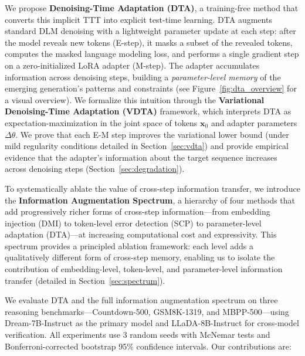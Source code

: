 \documentclass{article}
\begin{document}
We propose \textbf{Denoising-Time Adaptation (DTA)}, a training-free method that converts this implicit TTT into explicit test-time learning. DTA augments standard DLM denoising with a lightweight parameter update at each step: after the model reveals new tokens (E-step), it masks a subset of the revealed tokens, computes the masked language modeling loss, and performs a single gradient step on a zero-initialized LoRA adapter (M-step). The adapter accumulates information across denoising steps, building a \emph{parameter-level memory} of the emerging generation's patterns and constraints (see Figure~\ref{fig:dta_overview} for a visual overview). We formalize this intuition through the \textbf{Variational Denoising-Time Adaptation (VDTA)} framework, which interprets DTA as expectation-maximization in the joint space of tokens $\mathbf{x}_0$ and adapter parameters $\Delta\theta$. We prove that each E-M step improves the variational lower bound (under mild regularity conditions detailed in Section~\ref{sec:vdta}) and provide empirical evidence that the adapter's information about the target sequence increases across denoising steps (Section~\ref{sec:degradation}).

To systematically ablate the value of cross-step information transfer, we introduce the \textbf{Information Augmentation Spectrum}, a hierarchy of four methods that add progressively richer forms of cross-step information---from embedding injection (DMI) to token-level error detection (SCP) to parameter-level adaptation (DTA)---at increasing computational cost and expressivity. This spectrum provides a principled ablation framework: each level adds a qualitatively different form of cross-step memory, enabling us to isolate the contribution of embedding-level, token-level, and parameter-level information transfer (detailed in Section~\ref{sec:spectrum}).

We evaluate DTA and the full information augmentation spectrum on three reasoning benchmarks---Countdown-500, GSM8K-1319, and MBPP-500---using Dream-7B-Instruct as the primary model and LLaDA-8B-Instruct for cross-model verification. All experiments use 3 random seeds with McNemar tests and Bonferroni-corrected bootstrap 95\% confidence intervals. Our contributions are:
\end{document}
